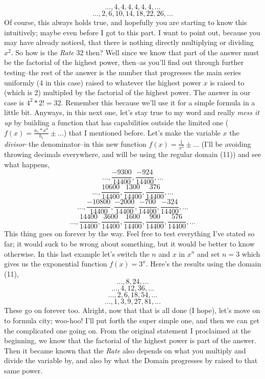 \documentclass[12pt, letterpaper]{report}
\begin{document}
$$\dots, 4, 4, 4, 4, 4, 4, \dots$$
\begin{equation}\dots, 2, 6, 10, 14, 18, 22, 26, \dots\end{equation}
Of course, this always holds true, and hopefully you are starting to know this intuitively; maybe even before I got to this part. I want to point out, because you may have already noticed, that there is nothing directly multiplying or dividing $x^2$. So how is the \textit{Rate} $32$ then? Well since we know that part of the answer must be the factorial of the highest power, then--as you'll find out through further testing--the rest of the answer is the number that progresses the main series uniformly (4 in this case) raised to whatever the highest power $x$ is raised to (which is 2) multipled by the factorial of the highest power. The answer in our case is $4^2*2!=32$. Remember this because we'll use it for a simple formula in a little bit. Anyways, in this next one, let's stay true to my word and really \textit{mess it up} by building a function that has capabilities outside the limited one ($f(x)=\frac{a_{1}*x^n}{b_{1}} \pm \dots$) that I mentioned before. Let's make the variable $x$ the \textit{divisor}--the denominator--in this new function $f(x)=\frac{1}{x^2} \pm \dots$ (I'll be avoiding throwing decimals everywhere, and will be using the regular domain (11)) and see what happens,
$$\dots, \frac{-9300}{14400}, \frac{-924}{14400}, \dots$$
$$\dots, \frac{10600}{14400}, \frac{1300}{14400}, \frac{376}{14400}, \dots$$
$$\dots, \frac{-10800}{14400}, \frac{-2000}{14400}, \frac{-700}{14400}, \frac{-324}{14400}, \dots$$
\begin{equation}\dots, \frac{14400}{14400}, \frac{3600}{14400}, \frac{1600}{14400}, \frac{900}{14400}, \frac{576}{14400}, \dots\end{equation}
This thing goes on forever by the way. Feel free to test everything I've stated so far; it would suck to be wrong about something, but it would be better to know otherwise. In this last example let's switch the $n$ and $x$ in $x^n$ and set $n=3$ which gives us the exponential function $f(x)=3^x$. Here's the results using the domain (11),
$$\dots, 8, 24, \dots$$
$$\dots, 4, 12, 36, \dots$$
$$\dots, 2, 6, 18, 54, \dots$$
\begin{equation}\dots, 1, 3, 9, 27, 81, \dots\end{equation}
These go on forever too. Alright, now that that is all done (I hope), let's move on to formula city; woo-hoo! I'll put forth the super simple one, and then we can get the complicated one going on. From the original statement I proclaimed at the beginning, we know that the factorial of the highest power is part of the answer. Then it became known that the \textit{Rate} also depends on what you multiply and divide the variable by, and also by what the Domain progresses by raised to that same power. \newline
\end{document}
